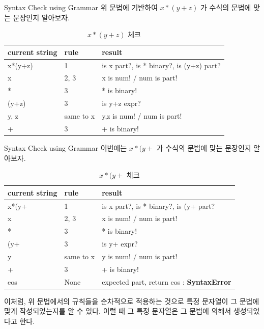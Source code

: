 \documentclass{beamer}
\begin{document}
\begin{frame}{Syntax Check using Grammar}
위 문법에 기반하여 $x*(y+z)$ 가 수식의 문법에 맞는 문장인지 알아보자. 

\begin{table}[]
\centering
\caption{$x*(y+z)$ 체크}
\label{my-label}
\begin{tabular}{|l|l|l|}
\hline
current string & rule & result \\ \hline
x*(y+z)&1    & is x part?, is * binary?, is (y+z) part?      \\ \hline
x &  2, 3 & x is num! / num is part!      \\ \hline
*& 3    & * is binary!      \\ \hline
(y+z)& 3    &  is y+z expr?      \\ \hline
y, z& same to x    &   y,z is num! / num is part!   \\ \hline
+ & 3    &  + is binary!     \\ \hline
\end{tabular}
\end{table}

\end{frame}

\begin{frame}{Syntax Check using Grammar} 
이번에는 $x*(y+$ 가 수식의 문법에 맞는 문장인지 알아보자. 

\begin{table}[]
\centering
\caption{$x*(y+$ 체크}
\label{my-label}
\begin{tabular}{|l|l|l|}
\hline
current string & rule & result \\ \hline
x*(y+ & 1    & is x part?, is * binary?, is (y+ part?      \\ \hline
x &  2, 3 & x is num! / num is part!      \\ \hline
*& 3    & * is binary!      \\ \hline
(y+& 3    &  is y+ expr?      \\ \hline
y & same to x    &   y is num! / num is part!   \\ \hline
+ & 3    &  + is binary!     \\ \hline
eos &  None  &  expected part, return eos : \textbf{SyntaxError}     \\ \hline
\end{tabular}
\end{table}
이처럼, 위 문법에서의 규칙들을 순차적으로 적용하는 것으로 특정 문자열이 그 문법에 맞게 작성되었는지를 알 수 있다. 이럴 때 그 특정 문자열은 그 문법에 의해서 생성되었다고 한다. 

\end{frame}
\end{document}
